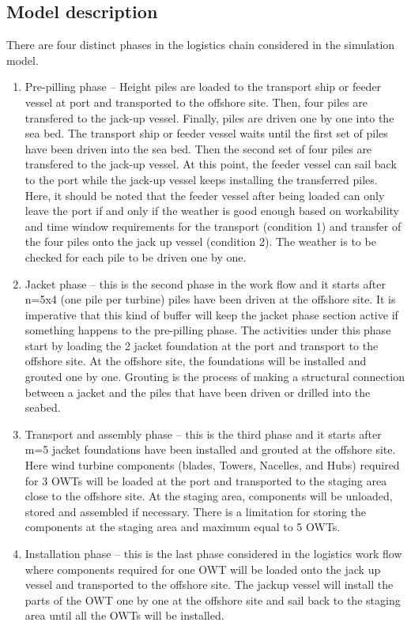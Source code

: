 \subsection{Model description}
There are four distinct phases in the logistics chain considered in the simulation model.
\begin{enumerate}
\item Pre-pilling phase -- Height piles are loaded to the transport ship or feeder vessel at port and transported to the offshore site. Then, four piles are transfered to the jack-up vessel. Finally, piles are driven one by one into the sea bed. The transport ship or feeder vessel waits until the first set of piles have been driven into the sea bed. Then the second set of four piles are transfered to the jack-up vessel. At this point, the feeder vessel can sail back to the port while the jack-up vessel keeps installing the transferred piles. Here, it should be noted that the feeder vessel after being loaded can only leave the port if and only if the weather is good enough based on workability and time window requirements for the transport (condition 1) and transfer of the four piles onto the jack up vessel (condition 2). The weather is to be checked for each pile to be driven one by one.
\item Jacket phase -- this is the second phase in the work flow and it starts after n=5x4 (one pile per turbine) piles have been driven at the offshore site. It is imperative that this kind of buffer will keep the jacket phase section active if something happens to the pre-pilling phase. The activities under this phase start by loading the 2 jacket foundation at the port and transport to the offshore site. At the offshore site, the foundations will be installed and grouted one by one. Grouting is the process of making a structural connection between a jacket and the piles that have been driven or drilled into the seabed.
\item Transport and assembly phase -- this is the third phase and it starts after m=5 jacket foundations have been installed and grouted at the offshore site. Here wind turbine components (blades, Towers, Nacelles, and Hubs) required for 3 OWTs will be loaded at the port and transported to the staging area close to the offshore site. At the staging area, components will be unloaded, stored and assembled if necessary. There is a limitation for storing the components at the staging area and maximum equal to 5 OWTs.
\item Installation phase -- this is the last phase considered in the logistics work flow where components required for one OWT will be loaded onto the jack up vessel and transported to the offshore site.  The jackup vessel will install the parts of the OWT one by one at the offshore site and sail back to the staging area until all the OWTs will be installed.
\end{enumerate}